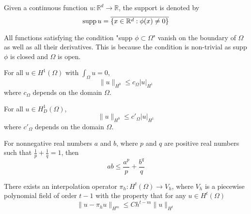 \begin{theorem}\label{def:support}
Given a continuous function $u : \mathbb{R}^d \rightarrow \mathbb{R}$, the support is denoted by 
\begin{align*}
\textnormal{supp} \, u = \overline{\{x \in \mathbb{R}^d : \phi(x) \neq 0\}}
\end{align*}
\end{theorem}
\begin{remark} All functions satisfying the condition "supp $\phi \subset \Omega$" vanish on the boundary of $\Omega$ as well as all their derivatives. This is because the condition is non-trivial as supp $\phi$ is closed and $\Omega$ is open. 
\end{remark}

\begin{theorem}\label{def:poincare}
For all $u \in H^1(\Omega)$ with $\int_\Omega u = 0$, 
\begin{equation}
\|u \|_{H^0} \leq c_\Omega |u|_{H^1}
\end{equation}
where $c_\Omega$ depends on the domain $\Omega$. 
\end{theorem}

\begin{theorem} \label{def:friedrich}
For all $u \in H^1_D(\Omega)$, 
\begin{equation}
\|u \|_{H^0} \leq c'_\Omega |u|_{H^1}
\end{equation}
where $c'_\Omega$ depends on the domain $\Omega$. 
\end{theorem}

\begin{theorem} \label{def:young}
For nonnegative real numbers $a$ and $b$, where $p$ and $q$ are positive real numbers such that $\frac{1}{p} + \frac{1}{q} = 1$, then
\begin{equation}
ab \leq \frac{a^p}{p} + \frac{b^q }{q}
\end{equation}
\end{theorem}

\begin{theorem} \label{def:approx}
There exists an interpolation operator $\pi_h : H^t(\Omega) \rightarrow V_h$, where $V_h$ is a piecewise polynomial field of order $t-1$ with the property that for any $u \in H^t(\Omega)$
\begin{equation}
\|u - \pi_h u \|_{H^m} \leq C h^{t-m}\| u\|_{H^t}
\end{equation}
\end{theorem}

